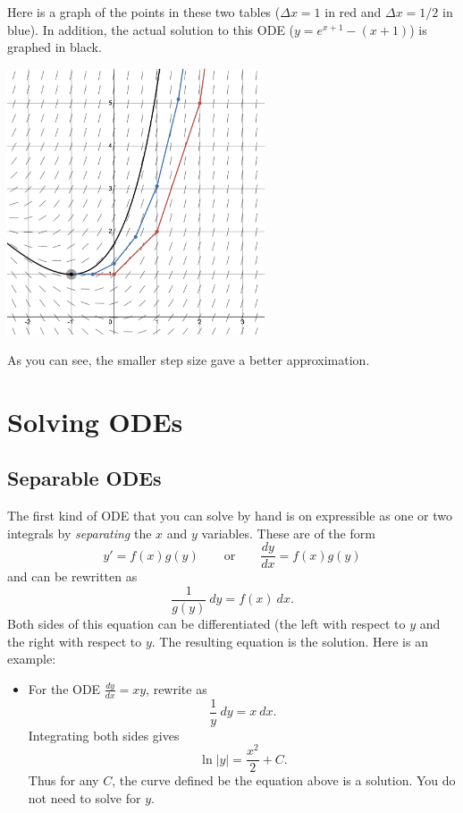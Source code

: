 \begin{itemize}[leftmargin=1em]
Here is a graph of the points in these two tables ($\Delta x = 1$ in red and $\Delta x = 1/2$ in blue). In addition, the actual solution to this ODE ($y=e^{x+1}-(x+1)$) is graphed in black.
\begin{center}
\includegraphics[width=3in]{img/eulers_method.png}
\end{center}
As you can see, the smaller step size gave a better approximation.
\end{itemize}


\section{Solving ODEs}
\subsection{Separable ODEs}
The first kind of ODE that you can solve by hand is on expressible as one or two integrals by \textit{separating} the $x$ and $y$ variables. These are of the form
$$y'=f(x)g(y) \quad\quad\text{or}\quad\quad \frac{dy}{dx}=f(x)g(y)$$
and can be rewritten as
$$\frac{1}{g(y)}\ dy = f(x)\ dx.$$
Both sides of this equation can be differentiated (the left with respect to $y$ and the right with respect to $y$. The resulting equation is the solution. Here is an example:
\begin{itemize}
\item For the ODE $\frac{dy}{dx} = xy$, rewrite as
$$\frac{1}{y}\ dy = x\ dx.$$
Integrating both sides gives
$$\ln|y| = \frac{x^2}{2} + C.$$
Thus for any $C$, the curve defined be the equation above is a solution. You do not need to solve for $y$.
\end{itemize}

